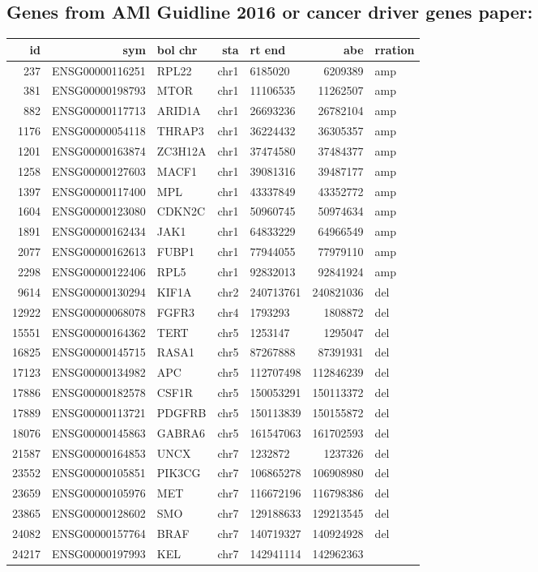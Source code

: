 \documentclass[]{article}
\begin{document}
\hypertarget{genes-from-aml-guidline-2016-or-cancer-driver-genes-paper}{%
\subsection{Genes from AMl Guidline 2016 or cancer driver genes
paper:}\label{genes-from-aml-guidline-2016-or-cancer-driver-genes-paper}}

\begin{longtable}[]{@{}rrlrlrl@{}}
\toprule
id & sym & bol chr & sta & rt end & abe & rration\tabularnewline
\midrule
\endhead
237 & ENSG00000116251 & RPL22 & chr1 & 6185020 & 6209389 &
amp\tabularnewline
381 & ENSG00000198793 & MTOR & chr1 & 11106535 & 11262507 &
amp\tabularnewline
882 & ENSG00000117713 & ARID1A & chr1 & 26693236 & 26782104 &
amp\tabularnewline
1176 & ENSG00000054118 & THRAP3 & chr1 & 36224432 & 36305357 &
amp\tabularnewline
1201 & ENSG00000163874 & ZC3H12A & chr1 & 37474580 & 37484377 &
amp\tabularnewline
1258 & ENSG00000127603 & MACF1 & chr1 & 39081316 & 39487177 &
amp\tabularnewline
1397 & ENSG00000117400 & MPL & chr1 & 43337849 & 43352772 &
amp\tabularnewline
1604 & ENSG00000123080 & CDKN2C & chr1 & 50960745 & 50974634 &
amp\tabularnewline
1891 & ENSG00000162434 & JAK1 & chr1 & 64833229 & 64966549 &
amp\tabularnewline
2077 & ENSG00000162613 & FUBP1 & chr1 & 77944055 & 77979110 &
amp\tabularnewline
2298 & ENSG00000122406 & RPL5 & chr1 & 92832013 & 92841924 &
amp\tabularnewline
9614 & ENSG00000130294 & KIF1A & chr2 & 240713761 & 240821036 &
del\tabularnewline
12922 & ENSG00000068078 & FGFR3 & chr4 & 1793293 & 1808872 &
del\tabularnewline
15551 & ENSG00000164362 & TERT & chr5 & 1253147 & 1295047 &
del\tabularnewline
16825 & ENSG00000145715 & RASA1 & chr5 & 87267888 & 87391931 &
del\tabularnewline
17123 & ENSG00000134982 & APC & chr5 & 112707498 & 112846239 &
del\tabularnewline
17886 & ENSG00000182578 & CSF1R & chr5 & 150053291 & 150113372 &
del\tabularnewline
17889 & ENSG00000113721 & PDGFRB & chr5 & 150113839 & 150155872 &
del\tabularnewline
18076 & ENSG00000145863 & GABRA6 & chr5 & 161547063 & 161702593 &
del\tabularnewline
21587 & ENSG00000164853 & UNCX & chr7 & 1232872 & 1237326 &
del\tabularnewline
23552 & ENSG00000105851 & PIK3CG & chr7 & 106865278 & 106908980 &
del\tabularnewline
23659 & ENSG00000105976 & MET & chr7 & 116672196 & 116798386 &
del\tabularnewline
23865 & ENSG00000128602 & SMO & chr7 & 129188633 & 129213545 &
del\tabularnewline
24082 & ENSG00000157764 & BRAF & chr7 & 140719327 & 140924928 &
del\tabularnewline
24217 & ENSG00000197993 & KEL & chr7 & 142941114 & 142962363 &

\end{longtable}
\end{document}
